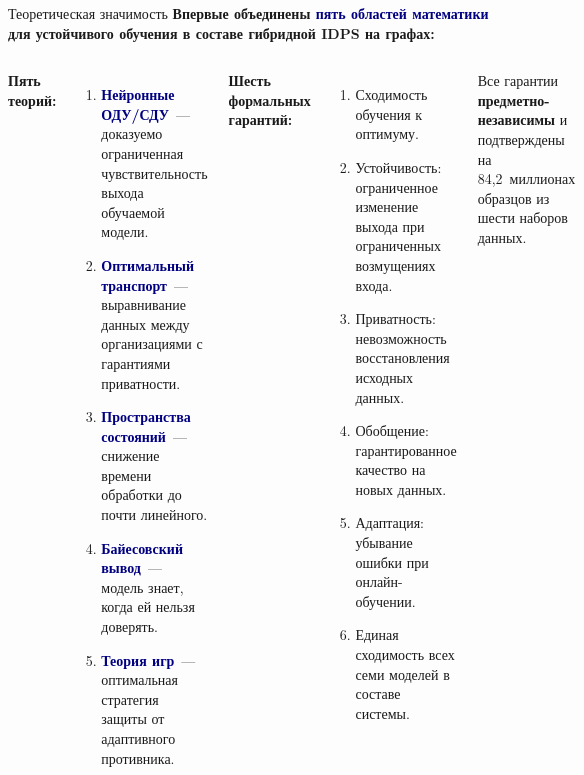 \documentclass[10pt,aspectratio=169]{beamer}
\newcommand{\hl}[1]{\textcolor{accent}{\textbf{#1}}}
\newcommand{\bn}[1]{\textcolor{navy}{\textbf{#1}}}
\begin{document}
\begin{frame}{Теоретическая значимость}
\textbf{Впервые объединены \bn{пять областей математики} для
устойчивого обучения в составе гибридной IDPS на графах:}
\smallskip
\begin{columns}[T,onlytextwidth]
\textbf{Пять теорий:}
\begin{enumerate}\setlength\itemsep{1pt}
\item \bn{Нейронные ОДУ/СДУ}~--- доказуемо ограниченная
чувствительность выхода обучаемой модели.
\item \bn{Оптимальный транспорт}~--- выравнивание данных
между организациями с гарантиями приватности.
\item \bn{Пространства состояний}~--- снижение времени
обработки до почти линейного.
\item \bn{Байесовский вывод}~--- модель знает, когда ей
нельзя доверять.
\item \bn{Теория игр}~--- оптимальная стратегия защиты от
адаптивного противника.
\end{enumerate}

\textbf{Шесть формальных гарантий:}
\begin{enumerate}\setlength\itemsep{1pt}
\item Сходимость обучения к оптимуму.
\item Устойчивость: ограниченное изменение выхода при
ограниченных возмущениях входа.
\item Приватность: невозможность восстановления исходных
данных.
\item Обобщение: гарантированное качество на новых данных.
\item Адаптация: убывание ошибки при онлайн-обучении.
\item Единая сходимость всех семи моделей в составе системы.
\end{enumerate}
\smallskip
\begin{block}{}
\scriptsize Все гарантии \hl{предметно-независимы} и
подтверждены на 84{,}2~миллионах образцов из шести наборов
данных.
\end{block}
\end{columns}
\end{frame}
\end{document}
